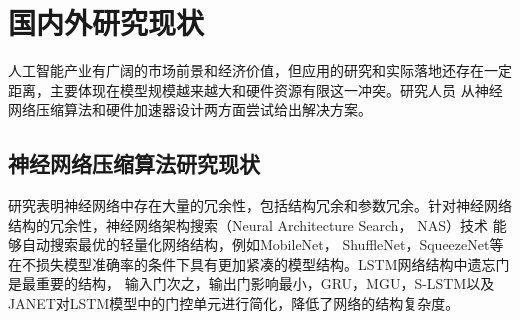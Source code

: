 

\section{国内外研究现状}
人工智能产业有广阔的市场前景和经济价值，但应用的研究和实际落地还存在一定距离，主要体现在模型规模越来越大和硬件资源有限这一冲突。研究人员
从神经网络压缩算法和硬件加速器设计两方面尝试给出解决方案。

\subsection{神经网络压缩算法研究现状}
研究表明神经网络中存在大量的冗余性，包括结构冗余和参数冗余。针对神经网络结构的冗余性，神经网络架构搜索（Neural Architecture Search， NAS）技术
能够自动搜索最优的轻量化网络结构，例如MobileNet，
ShuffleNet，SqueezeNet等在不损失模型准确率的条件下具有更加紧凑的模型结构。LSTM网络结构中遗忘门是最重要的结构，
输入门次之，输出门影响最小，GRU，MGU，S-LSTM以及JANET对LSTM模型中的门控单元进行简化，降低了网络的结构复杂度。

